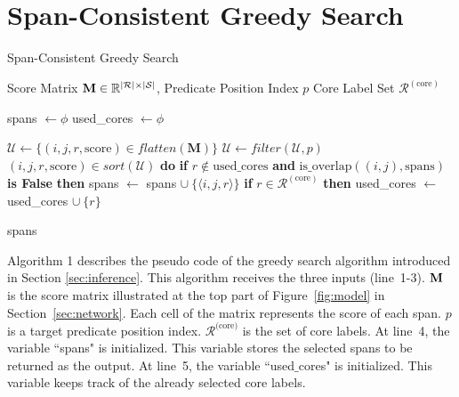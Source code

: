 \documentclass[11pt,a4paper]{article}
\begin{document}



\newpage
\appendix

\section{Span-Consistent Greedy Search}
\label{sec:decode}
\begin{algorithm}[H]
\caption{Span-Consistent Greedy Search}
\begin{algorithmic}[1]
 Score Matrix ${\bf M} \in \mathbb{R}^{|\mathcal{R}| \times |\mathcal{S}|}$, 
\STATE \hspace{1.1cm} Predicate Position Index $p$
\STATE \hspace{1.1cm} Core Label Set $\mathcal{R}^{(\text{core})}$

\STATE spans $\leftarrow \phi$
\STATE used\_cores $\leftarrow \phi$

\STATE $\mathcal{U} \leftarrow \{ (i, j, r, \text{score}) \in flatten(\textbf{M}) \}$
\STATE $\mathcal{U} \leftarrow filter(\mathcal{U}, p)$
 $(i, j, r, \text{score}) \in sort(\mathcal{U})$ {\bf do}
\STATE \hspace{0.25cm} {\bf if} $r \notin \text{used\_cores}$ {\bf and}
\STATE \hspace{0.6cm} $\text{is\_overlap}((i, j), \text{spans})$ {\bf is False} {\bf then}
\STATE \hspace{1cm} spans $\leftarrow$ spans $\cup \: \{ \langle i, j, r \rangle \}$
\STATE \hspace{1cm} {\bf if} $r \in \mathcal{R}^{(\text{core})}$ {\bf then}
\STATE \hspace{1.3cm} used\_cores $\leftarrow$ used\_cores $\cup \: \{ r \}$

 spans
\end{algorithmic}
\end{algorithm}

\noindent
Algorithm 1 describes the pseudo code of the greedy search algorithm introduced in Section \ref{sec:inference}.
This algorithm receives the three inputs (line~1-3).
${\bf M}$ is the score matrix illustrated at the top part of Figure\ \ref{fig:model} in Section\ \ref{sec:network}.
Each cell of the matrix represents the score of each span.
$p$ is a target predicate position index.
$\mathcal{R}^\text{(core)}$ is the set of core labels.
At line~4, the variable ``spans" is initialized.
This variable stores the selected spans to be returned as the output.
At line~5, the variable ``used$\_$cores" is initialized.
This variable keeps track of the already selected core labels.
\end{document}
